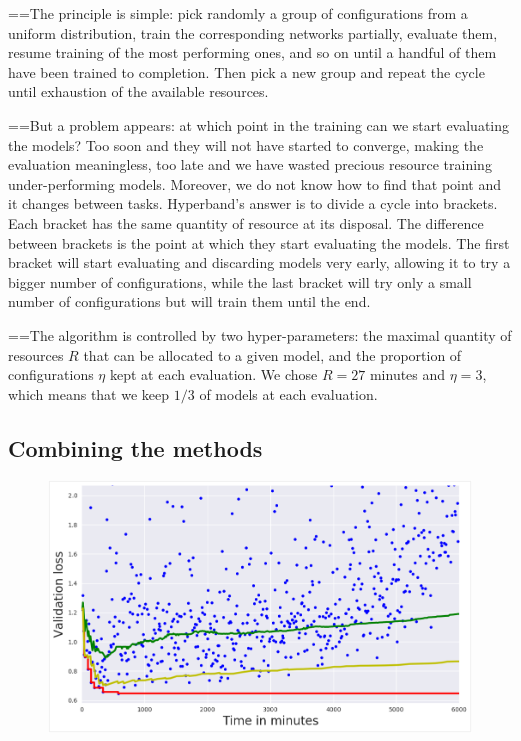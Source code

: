 ==The principle is simple: pick randomly a group of configurations from a uniform distribution, train the corresponding networks partially, evaluate them, resume training of the most performing ones, and so on until a handful of them have been trained to completion. Then pick a new group and repeat the cycle until exhaustion of the available resources.

==But a problem appears: at which point in the training can we start evaluating the models? Too soon and they will not have started to converge, making the evaluation meaningless, too late and we have wasted precious resource training under-performing models. Moreover, we do not know how to find that point and it changes between tasks. Hyperband's answer is to divide a cycle into brackets. Each bracket has the same quantity of resource at its disposal. The difference between brackets is the point at which they start evaluating the models. The first bracket will start evaluating and discarding models very early, allowing it to try a bigger number of configurations, while the last bracket will try only a small number of configurations but will train them until the end.

==The algorithm is controlled by two hyper-parameters: the maximal quantity of resources $R$ that can be allocated to a given model, and the proportion of configurations $\eta$ kept at each evaluation. We chose $R = 27$ minutes and $\eta = 3$, which means that we keep $1/3$ of models at each evaluation.

\subsection{Combining the methods}

\begin{figure}[htb]
	\centering
	\includegraphics[width=.95\linewidth]{img_hyperopt/bo_acc_time.png}
	\label{fig:bo_acc_time}
\end{figure}


